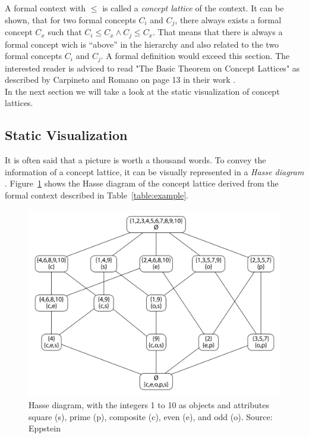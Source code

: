 \documentclass[11pt]{report}
\begin{document}
A formal context with $\le$ is called a \textit{concept lattice} of the context. It can be shown, that for two formal concepts $C_i$ and $C_j$, there always exists a formal concept $C_x$ such that $C_i \le C_x \wedge C_j \le C_x$. That means that there is always a formal concept wich is ``above'' in the hierarchy and also related to the two formal concepts $C_i$ and $C_j$. A formal definition would exceed this section. The interested reader is adviced to read "The Basic Theorem on Concept Lattices" as described by Carpineto and Romano on page 13 in their work \cite{carpineto2004concept}.\\

In the next section we will take a look at the static visualization of concept lattices.

\subsection{Static Visualization}

It is often said that a picture is worth a thousand words. To convey the information of a concept lattice, it can be visually represented in a \textit{Hasse diagram} \cite{Ganter2012}. Figure~\ref{figure:example} shows the Hasse diagram of the concept lattice derived from the formal context described in Table~\ref{table:example}. \\

\begin{figure}[!ht]
	\centering
	\includegraphics[width=\linewidth]{./images/fcaExample}
\caption{Hasse diagram, with the integers 1 to 10 as objects and attributes square (s), prime (p), composite (c), even (e), and odd (o). Source: Eppstein \cite{fcaexample}}
\label{figure:example}
\end{figure}
\end{document}
